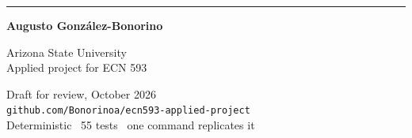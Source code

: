 \begin{titlepage}
\vfill

{\color{rule}\rule{\linewidth}{0.4pt}}\par\vspace{0.6em}
\noindent
\begin{minipage}[t]{0.44\linewidth}\raggedright
{\small\bfseries\color{ink} Augusto Gonz\'alez-Bonorino}\par\vspace{0.15em}
{\footnotesize\color{line} Arizona State University\\
Applied project for ECN 593\par}
\end{minipage}\hfill
\begin{minipage}[t]{0.54\linewidth}\raggedleft
{\footnotesize\color{line} Draft for review, October 2026\\
\texttt{github.com/Bonorinoa/ecn593-applied-project}\\
Deterministic \textperiodcentered\ 55 tests \textperiodcentered\ one command replicates it\par}
\end{minipage}
\end{titlepage}

